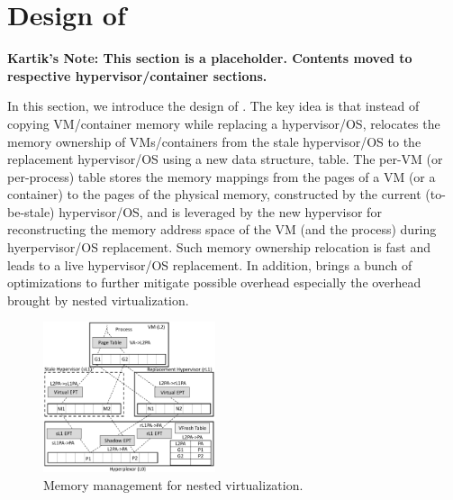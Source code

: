 \section{Design of \arch}
{\bf Kartik's Note: This section is a placeholder. Contents moved to respective hypervisor/container sections.}

In this section, we introduce the design of \arch. 
The key idea is that instead of copying VM/container memory while replacing a hypervisor/OS, \arch relocates the memory ownership of VMs/containers from the stale hypervisor/OS to the replacement hypervisor/OS using a new data structure, \arch table. The per-VM (or per-process) \arch table stores the memory mappings from the pages of a VM (or a container) to the  pages of the physical memory, constructed by the current (to-be-stale) hypervisor/OS, and is leveraged by the new hypervisor for reconstructing the memory address space of the VM (and the process) during hyerpervisor/OS replacement. Such memory ownership relocation is fast and leads to a live hypervisor/OS replacement. In addition, \arch brings a bunch of optimizations to further mitigate possible overhead especially the overhead brought by nested virtualization.


\begin{figure}[t!]
 	  \includegraphics[width=0.45\textwidth]{figures/vfresh-table.pdf}
  \caption{Memory management for nested virtualization.}
  \label{fig:mapping}
\end{figure}

